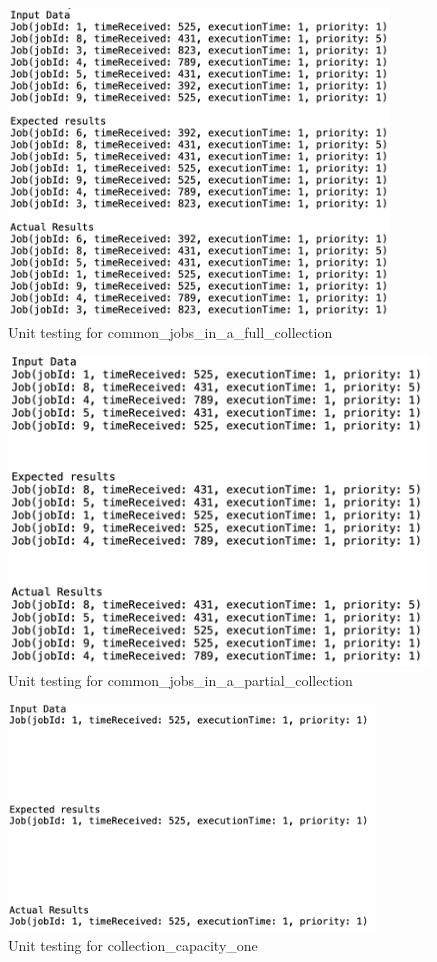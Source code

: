 \documentclass[a4paper]{article}
\begin{document}
\begin{figure}[H]
   \includegraphics[height=8.2cm]{images/FCFS-common_jobs_in_a_full_collection.png}
   \caption{Unit testing for common\_jobs\_in\_a\_full\_collection}
\end{figure}

\begin{figure}[H]
   \includegraphics[height=8.2cm]{images/FCFS-common_jobs_in_a_partial_collection.png}
   \caption{Unit testing for common\_jobs\_in\_a\_partial\_collection}
\end{figure}

\begin{figure}[H]
   \includegraphics[height=6cm]{images/FCFS-collection_capacity_one.png}
   \caption{Unit testing for collection\_capacity\_one}
\end{figure}
\end{document}
